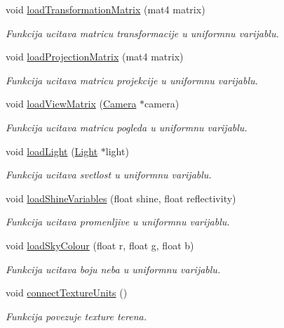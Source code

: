 \begin{DoxyCompactItemize}
void \hyperlink{classshader_1_1TerrainShader_aea937c6d3218296ebc0b9bc411c1c473}{load\+Transformation\+Matrix} (mat4 matrix)
\begin{DoxyCompactList}\small\item\em Funkcija ucitava matricu transformacije u uniformnu varijablu. \end{DoxyCompactList}\item 
void \hyperlink{classshader_1_1TerrainShader_a16bbac5b77cac98811441dcd1f212e77}{load\+Projection\+Matrix} (mat4 matrix)
\begin{DoxyCompactList}\small\item\em Funkcija ucitava matricu projekcije u uniformnu varijablu. \end{DoxyCompactList}\item 
void \hyperlink{classshader_1_1TerrainShader_a7a59458cbaa83284c2a74b372d6f6697}{load\+View\+Matrix} (\hyperlink{classentity_1_1Camera}{Camera} $\ast$camera)
\begin{DoxyCompactList}\small\item\em Funkcija ucitava matricu pogleda u uniformnu varijablu. \end{DoxyCompactList}\item 
void \hyperlink{classshader_1_1TerrainShader_a4c45561760ed2142804589352a820acd}{load\+Light} (\hyperlink{classentity_1_1Light}{Light} $\ast$light)
\begin{DoxyCompactList}\small\item\em Funkcija ucitava svetlost u uniformnu varijablu. \end{DoxyCompactList}\item 
void \hyperlink{classshader_1_1TerrainShader_a726a1237f6c1ebae3c3534b80260c553}{load\+Shine\+Variables} (float shine, float reflectivity)
\begin{DoxyCompactList}\small\item\em Funkcija ucitava promenljive u uniformnu varijablu. \end{DoxyCompactList}\item 
void \hyperlink{classshader_1_1TerrainShader_af1a33992fb70f65ba37dba1e4027a74e}{load\+Sky\+Colour} (float r, float g, float b)
\begin{DoxyCompactList}\small\item\em Funkcija ucitava boju neba u uniformnu varijablu. \end{DoxyCompactList}\item 
void \hyperlink{classshader_1_1TerrainShader_aa4317635c2194f8a6fbfe08dffeaedfd}{connect\+Texture\+Units} ()
\begin{DoxyCompactList}\small\item\em Funkcija povezuje texture terena. \end{DoxyCompactList}\end{DoxyCompactItemize}
